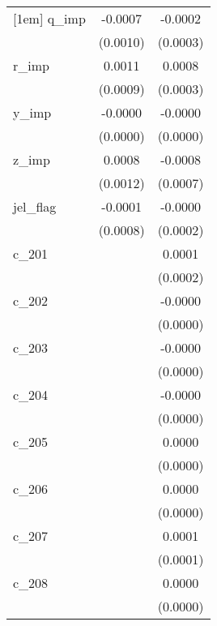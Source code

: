 {\begin{tabular}{l*{2}{c}}
[1em]
q\_imp       &     -0.0007        &     -0.0002        \\
            &    (0.0010)        &    (0.0003)        \\
[1em]
r\_imp       &      0.0011        &      0.0008\sym{**}\\
            &    (0.0009)        &    (0.0003)        \\
[1em]
y\_imp       &     -0.0000        &     -0.0000\sym{**}\\
            &    (0.0000)        &    (0.0000)        \\
[1em]
z\_imp       &      0.0008        &     -0.0008        \\
            &    (0.0012)        &    (0.0007)        \\
[1em]
jel\_flag    &     -0.0001        &     -0.0000        \\
            &    (0.0008)        &    (0.0002)        \\
[1em]
c\_201       &                    &      0.0001        \\
            &                    &    (0.0002)        \\
[1em]
c\_202       &                    &     -0.0000        \\
            &                    &    (0.0000)        \\
[1em]
c\_203       &                    &     -0.0000        \\
            &                    &    (0.0000)        \\
[1em]
c\_204       &                    &     -0.0000        \\
            &                    &    (0.0000)        \\
[1em]
c\_205       &                    &      0.0000        \\
            &                    &    (0.0000)        \\
[1em]
c\_206       &                    &      0.0000        \\
            &                    &    (0.0000)        \\
[1em]
c\_207       &                    &      0.0001        \\
            &                    &    (0.0001)        \\
[1em]
c\_208       &                    &      0.0000        \\
            &                    &    (0.0000)        \\

\end{tabular}}
